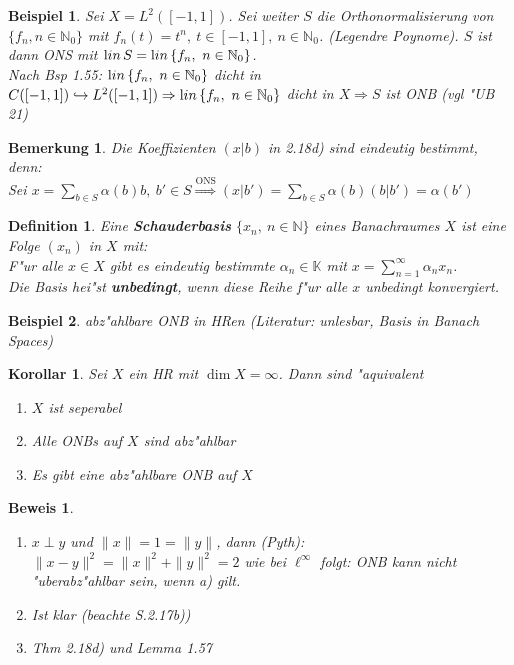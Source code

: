\documentclass[a4paper,11pt]{book}
\newcommand{\N}{{\mathbb N}}
\newcommand{\K}{{\mathbb K}}
\newcommand{\begriff}[1]{\textbf{#1}} %
\newcommand{\lin}{\ensuremath{\text lin}\,} %
\newtheorem*{DefNO}{Definition}
\newtheorem{Kor}[Def]{Korollar}
\newtheorem*{BspNO}{Beispiel}
\newtheorem{Bem}[Def]{Bemerkung}
\theoremstyle{nonumberplain}
\newtheorem{Bew}{Beweis}
\begin{document}
\begin{BspNO}
Sei $X = L^2([-1,1])$. Sei weiter $S$ die Orthonormalisierung von $\{ f_n, n \in \N_0\}$ mit $f_n(t) = t^n,\ t \in [-1,1],\ n\in \N_0$. (Legendre Poynome). $S$ ist dann ONS mit $\lin S = \lin \{f_n,\ n \in \N_0\}$.\\
Nach Bsp 1.55: $\lin \{f_n,\ n \in \N_0\}$ dicht in $C([-1,1]) \hookrightarrow L^2([-1,1]) \Rightarrow \lin \{f_n,\ n \in \N_0\}$ dicht in $X \Rightarrow S$ ist ONB (vgl "UB 21)
\end{BspNO}


\begin{Bem}
Die Koeffizienten $(x|b)$ in 2.18d) sind eindeutig bestimmt, denn:\\
Sei $x = \sum_{b \in S} \alpha(b) b,\ b' \in S \stackrel{\text{ONS}}{\Rightarrow} (x|b') = \sum_{b \in S} \alpha(b)(b|b') = \alpha (b')$
\end{Bem}


\begin{DefNO}
Eine \begriff{Schauderbasis} $\{x_n,\ n \in \N\}$ eines Banachraumes $X$ ist eine Folge $(x_n)$ in $X$ mit:\\
F"ur alle $x \in X$ gibt es eindeutig bestimmte $\alpha_n \in \K$ mit $x = \sum_{n=1}^{\infty} \alpha_n x_n$.\\
Die Basis hei"st \begriff{unbedingt}, wenn diese Reihe f"ur alle $x$ unbedingt konvergiert.
\end{DefNO}


\begin{BspNO}
abz"ahlbare ONB in HRen (Literatur: unlesbar, Basis in Banach Spaces)
\end{BspNO}



\begin{Kor}
Sei $X$ ein HR mit $\dim X = \infty$. Dann sind "aquivalent
\begin{enumerate}
\item[a)] $X$ ist seperabel

\item[b)] Alle ONBs auf $X$ sind abz"ahlbar

\item[c)] Es gibt eine abz"ahlbare ONB auf $X$
\end{enumerate}
\end{Kor}


\begin{Bew}
\begin{enumerate}
\item[a) $\Rightarrow$ b)] $x \perp y$ und $\|x\| = 1 = \|y\|$, dann (Pyth): $\|x-y\|^2 = \|x\|^2 + \|y\|^2 = 2$ wie bei $\ell^{\infty}$ folgt: ONB kann nicht "uberabz"ahlbar sein, wenn a) gilt.

\item[b) $\Rightarrow$ c)] Ist klar (beachte S.2.17b))

\item[c) $\Rightarrow$ a)] Thm 2.18d) und Lemma 1.57
\end{enumerate}
\end{Bew}
\end{document}
